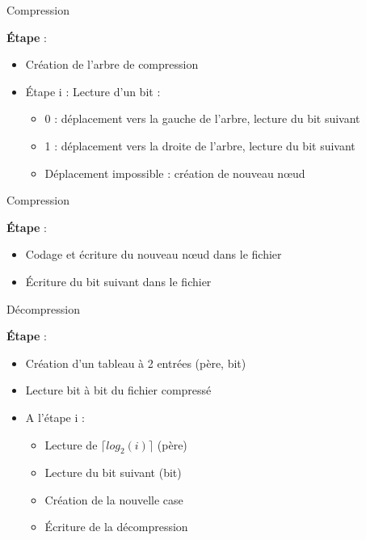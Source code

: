 \documentclass[french]{beamer}
\begin{document}
\begin{frame}{Compression}
	\begin{center}
	\textbf{Étape} :
	\begin{itemize}
	\item<2-6>  Création de l'arbre de compression
	\item<3-6>  Étape i : Lecture d'un bit :
			\begin{itemize}
				\item<4-6> 0 : déplacement vers la gauche de l'arbre, lecture du bit suivant
				\item<5-6> 1 : déplacement vers la droite de l'arbre, lecture du bit suivant
				\item<6-6> Déplacement impossible : création de nouveau nœud 
			\end{itemize}
	\end{itemize}
	\end{center}
\end{frame}
	
\begin{frame}{Compression}
	\begin{center}
	\textbf{Étape} :
	\begin{itemize}
	\item<1-2>  Codage et écriture du nouveau nœud dans le fichier
	\item<2> Écriture du bit suivant dans le fichier
	\end{itemize}
	\end{center}
\end{frame}

\begin{frame}{Décompression}
	\begin{center}
	\textbf{Étape} :
		\begin{itemize}
		\item<2-8>  Création d'un tableau à 2 entrées (père, bit)
		\item<3-8> Lecture bit à bit du fichier compressé
		\item<4-8>  A l'étape i : 
			\begin{itemize}
				\item<5-8> Lecture de $\lceil log_{2}(i) \rceil$ (père)
				\item<6-8> Lecture du bit suivant (bit) 
				\item<7-8> Création de la nouvelle case
				\item<8> Écriture de la décompression  
			\end{itemize}
		\end{itemize}
	\end{center}
\end{frame}
\end{document}
